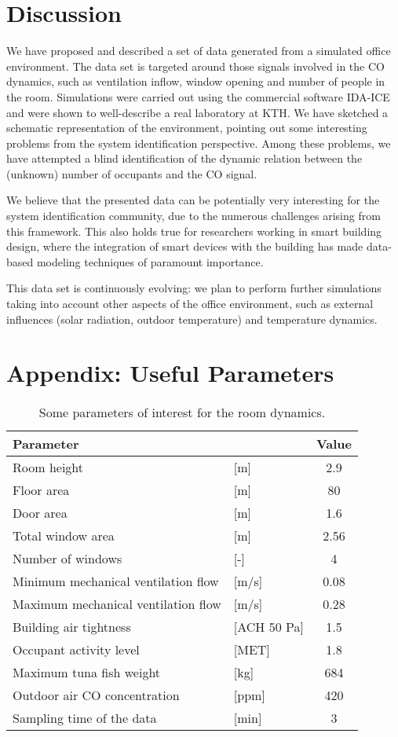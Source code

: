 \documentclass{article}
\begin{document}
\section{Discussion}
We have proposed and described a set of data generated from a simulated office
environment. The data set is targeted around those signals involved in the
CO dynamics, such as ventilation inflow, window opening and number of
people in the room. Simulations were carried out using the commercial software
IDA-ICE and were shown to well-describe a real laboratory at KTH\@. We have
sketched a schematic representation of the environment, pointing out some
interesting problems from the system identification perspective. Among these
problems, we have attempted a blind identification of the dynamic relation
between the (unknown) number of occupants and the CO signal.

We believe that the presented data can be potentially very interesting for the
system identification community, due to the numerous challenges arising from
this framework. This also holds true for researchers working in smart building
design, where the integration of smart devices with the building has made
data-based modeling techniques of paramount importance.

This data set is continuously evolving: we plan to perform further
simulations taking into account other aspects of the office environment, such
as external influences (solar radiation, outdoor temperature) and temperature
dynamics.

\section*{Appendix: Useful Parameters}


\begin{table}[h!]\label{tab:parameters}
\begin{center}
\begin{tabular}{llc}
\toprule
Parameter &  & Value \\
\midrule
Room height &[m] & 2.9\\
Floor area &[m] &  80\\
Door area &[m] & 1.6\\
Total window area & [m] & 2.56\\
Number of windows &[-] & 4\\
Minimum mechanical ventilation flow& [m/s] & 0.08 \\
Maximum mechanical ventilation flow& [m/s] & 0.28 \\
Building air tightness& [ACH  50 Pa] & 1.5 \\
Occupant activity level& [MET] & 1.8 \\
Maximum tuna fish weight  & [kg] & 684 \\
Outdoor air CO concentration& [ppm] & 420\\
Sampling time of the data& [min] & 3\\
\bottomrule
\end{tabular}
\vspace{2mm}
\caption{Some parameters of interest for the room dynamics.}
\end{center}
\end{table}


\appendix

\printbibliography{}
\end{document}
